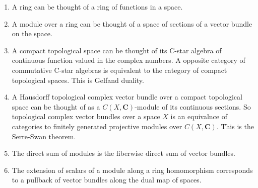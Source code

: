 \documentclass[10pt]{article}
\theoremstyle{plain}%
\theoremstyle{definition}
\theoremstyle{remark}
\begin{document}
\begin{enumerate}
	\item A ring can be thought of a ring of functions in a space.
	\item A module over a ring can be thought of a space of sections of a vector bundle on the space.
	\item A compact topological space can be thought of its C-star algebra of continuous function valued in the complex numbers. A opposite category of commutative C-star algebras is equivalent to the category of compact topological spaces. This is Gelfand duality.
	\item A Hausdorff topological complex vector bundle over a compact topological space can be thought of as a $C(X, \mathbf{C})$-module of its continuous sections. So topological complex vector bundles over a space $X$ is an equivalnce of categories to finitely generated projective modules over $C(X, \mathbf{C})$. This is the Serre-Swan theorem.
	\item The direct sum of modules is the fiberwise direct sum of vector bundles.
	\item The extension of scalars of a module along a ring homomorphism corresponds to a pullback of vector bundles along the dual map of spaces.
\end{enumerate}
\end{document}
